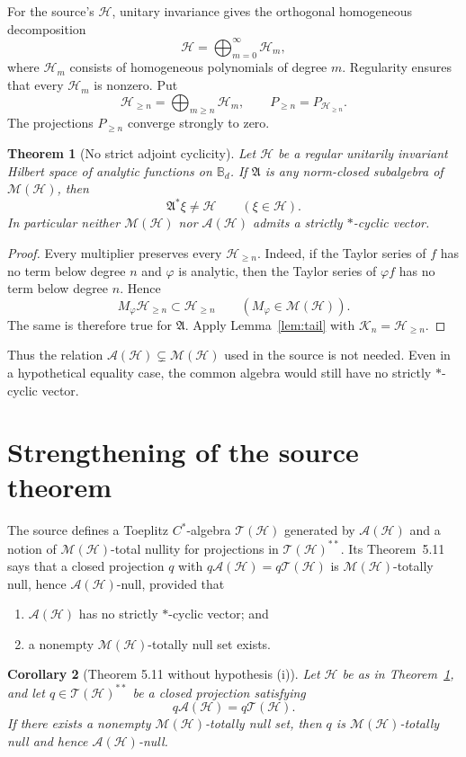\documentclass[11pt]{article}
\newtheorem{theorem}{Theorem}
\newtheorem{corollary}[theorem]{Corollary}
\newcommand{\A}{\mathcal A}
\newcommand{\Hh}{\mathcal H}
\newcommand{\Kk}{\mathcal K}
\newcommand{\M}{\mathcal M}
\newcommand{\Tt}{\mathcal T}
\newcommand{\B}{\mathbb B}
\begin{document}
For the source's $\Hh$, unitary invariance gives the orthogonal homogeneous
decomposition
\[
 \Hh=\bigoplus_{m=0}^{\infty}\Hh_m,
\]
where $\Hh_m$ consists of homogeneous polynomials of degree $m$.  Regularity
ensures that every $\Hh_m$ is nonzero.  Put
\[
 \Hh_{\geq n}=\bigoplus_{m\geq n}\Hh_m,
 \qquad P_{\geq n}=P_{\Hh_{\geq n}}.
\]
The projections $P_{\geq n}$ converge strongly to zero.

\begin{theorem}[No strict adjoint cyclicity]\label{thm:main}
Let $\Hh$ be a regular unitarily invariant Hilbert space of analytic
functions on $\B_d$.  If $\mathfrak A$ is any norm-closed subalgebra of
$\M(\Hh)$, then
\[
 \mathfrak A^*\xi\neq\Hh\qquad(\xi\in\Hh).
\]
In particular neither $\M(\Hh)$ nor $\A(\Hh)$ admits a strictly
$*$-cyclic vector.
\end{theorem}

\begin{proof}
Every multiplier preserves every $\Hh_{\geq n}$.  Indeed, if the Taylor
series of $f$ has no term below degree $n$ and $\varphi$ is analytic, then
the Taylor series of $\varphi f$ has no term below degree $n$.  Hence
\[
 M_\varphi\Hh_{\geq n}\subset\Hh_{\geq n}
 \qquad(M_\varphi\in\M(\Hh)).
\]
The same is therefore true for $\mathfrak A$.  Apply
Lemma~\ref{lem:tail} with $\Kk_n=\Hh_{\geq n}$.
\end{proof}

Thus the relation $\A(\Hh)\subsetneq\M(\Hh)$ used in the source is not
needed.  Even in a hypothetical equality case, the common algebra would
still have no strictly $*$-cyclic vector.

\section{Strengthening of the source theorem}

The source defines a Toeplitz $C^*$-algebra $\Tt(\Hh)$ generated by
$\A(\Hh)$ and a notion of $\M(\Hh)$-total nullity for projections in
$\Tt(\Hh)^{**}$.  Its Theorem~5.11 says that a closed projection $q$ with
$q\A(\Hh)=q\Tt(\Hh)$ is $\M(\Hh)$-totally null, hence
$\A(\Hh)$-null, provided that
\begin{enumerate}
\item $\A(\Hh)$ has no strictly $*$-cyclic vector; and
\item a nonempty $\M(\Hh)$-totally null set exists.
\end{enumerate}

\begin{corollary}[Theorem 5.11 without hypothesis (i)]\label{cor:null}
Let $\Hh$ be as in Theorem~\ref{thm:main}, and let
$q\in\Tt(\Hh)^{**}$ be a closed projection satisfying
\[
 q\A(\Hh)=q\Tt(\Hh).
\]
If there exists a nonempty $\M(\Hh)$-totally null set, then $q$ is
$\M(\Hh)$-totally null and hence $\A(\Hh)$-null.
\end{corollary}
\end{document}

